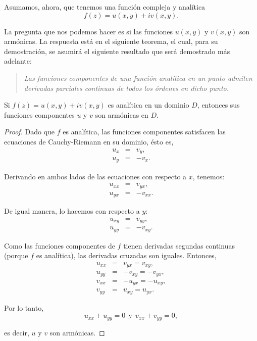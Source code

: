 Asumamos, ahora, que tenemos una función compleja y analítica
$$f(z) = u(x,y) + iv(x,y).$$

La pregunta que nos podemos hacer es si las funciones $u(x,y)$ y $v(x,y)$ son armónicas. La respuesta está en el siguiente teorema, el cual, para su demostración, se asumirá el siguiente resultado que será demostrado más adelante:

\begin{quote}
\textit{Las funciones componentes de una función analítica en un punto admiten derivadas parciales continuas de todos los órdenes en dicho punto.}
\end{quote}

\begin{teorema}
Si $f(z) = u(x,y) + iv(x,y)$ es analítica en un dominio $D$, entonces sus funciones componentes $u$ y $v$ son armónicas en $D$.
\end{teorema}

\begin{proof}
Dado que $f$ es analítica, las funciones componentes satisfacen las ecuaciones de Cauchy-Riemann en su dominio, ésto es,
\begin{eqnarray*}
u_x &=& v_y ,\\
u_y &=& -v_x .
\end{eqnarray*}

Derivando en ambos lados de las ecuaciones con respecto a $x$, tenemos:
\begin{eqnarray*}
u_{xx} &=& v_{yx}, \\
u_{yx} &=& -v_{xx}. 
\end{eqnarray*}

De igual manera, lo hacemos con respecto a $y$:
\begin{eqnarray*}
u_{xy} &=& v_{yy},\\
u_{yy} &=& -v_{xy} .
\end{eqnarray*}

Como las funciones componentes de $f$ tienen derivadas segundas continuas (porque $f$ es analítica), las derivadas cruzadas son iguales. Entonces,
\begin{eqnarray*}
u_{xx} &=& v_{yx} = v_{xy}, \\
u_{yy} &=& - v_{xy} = - v_{yx}, \\
v_{xx} &=& - u_{yx} = - u_{xy}, \\
v_{yy} &=& u_{xy} = u_{yx} .
\end{eqnarray*}

Por lo tanto,
$$u_{xx} + u_{yy} = 0 ~~\mbox{y}~~ v_{xx} + v_{yy} = 0,$$

es decir, $u$ y $v$ son armónicas.

\end{proof}

